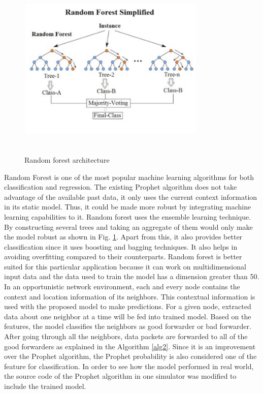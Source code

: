 \documentclass[10pt,journal]{IEEEtran}
\begin{document}
\begin{figure}[H]
\centering
\includegraphics[width=9cm, height=8cm]{random_forest.png}\\
\caption{Random forest architecture}
\label{ran}
\end{figure}

Random Forest is one of the most popular machine learning algorithms for both classification and regression. The existing Prophet algorithm does not take advantage of the available past data, it only uses the current context information in its static model. Thus, it could be made more robust by integrating machine learning capabilities to it. Random forest uses the ensemble learning technique. By constructing several trees and taking an aggregate of them would only make the model robust as shown in Fig. \ref{ran}. Apart from this, it also provides better classification since it uses boosting and bagging techniques. It also helps in avoiding overfitting compared to their counterparts. Random forest is better suited for this particular application because it can work on multidimensional input data and the data used to train the model has a dimension greater than 50.
In an opportunistic network environment, each and every node contains the context and location information of its neighbors. This contextual information is used with the proposed model to make predictions. 
For a given node, extracted data about one neighbor at a time will be fed into trained model. Based on the features, the model classifies the neighbors as good forwarder or bad forwarder. After going through all the neighbors, data packets are forwarded to all of the good forwarders as explained in the Algorithm \ref{alg2}.  
Since it is an improvement over the Prophet algorithm, the Prophet probability is also considered one of the feature for classification. In order to see how the model performed in real world, the source code of the Prophet algorithm in one simulator was modified to include the trained model. 
\end{document}
